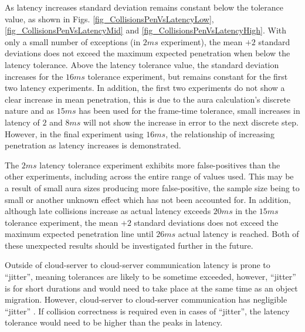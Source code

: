 As latency increases standard deviation remains constant below the tolerance value, as shown in Figs. \ref{fig_CollisionsPenVsLatencyLow}, \ref{fig_CollisionsPenVsLatencyMid} and \ref{fig_CollisionsPenVsLatencyHigh}. With only a small number of exceptions (in $2ms$ experiment), the mean $+2$ standard deviations does not exceed the maximum expected penetration when below the latency tolerance. Above the latency tolerance value, the standard deviation increases for the $16ms$ tolerance experiment, but remains constant for the first two latency experiments. In addition, the first two experiments do not show a clear increase in mean penetration, this is due to the aura calculation's discrete nature and as $15ms$ has been used for the frame-time tolerance, small increases in latency of $2$ and $8ms$ will not show the increase in error to the next discrete step. However, in the final experiment using $16ms$, the relationship of increasing penetration as latency increases is demonstrated.

The $2ms$ latency tolerance experiment exhibits more false-positives than the other experiments, including across the entire range of values used. This may be a result of small aura sizes producing more false-positive, the sample size being to small or another unknown effect which has not been accounted for. In addition, although late collisions increase as actual latency exceeds $20ms$ in the $15ms$ tolerance experiment, the mean $+2$ standard deviations does not exceed the maximum expected penetration line until $26ms$ actual latency is reached. Both of these unexpected results should be investigated further in the future.

Outside of cloud-server to cloud-server communication latency is prone to ``jitter'', meaning tolerances are likely to be sometime exceeded, however, ``jitter'' is for short durations and would need to take place at the same time as an object migration. However, cloud-server to cloud-server communication has negligible ``jitter'' \cite{ThousandEyesCloudPerf2018}. If collision correctness is required even in cases of ``jitter'', the latency tolerance would need to be higher than the peaks in latency. 

